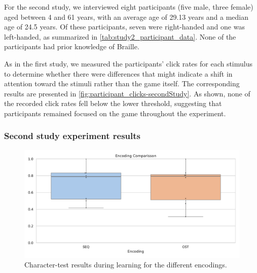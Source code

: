 

For the second study, we interviewed eight participants (five male, three female) aged between 4 and 61 years, with an average age of 29.13 years and a median age of 24.5 years. Of these participants, seven were right-handed and one was left-handed, as summarized in \autoref{tab:study2_participant_data}. None of the participants had prior knowledge of Braille.

As in the first study, we measured the participants' click rates for each stimulus to determine whether there were differences that might indicate a shift in attention toward the stimuli rather than the game itself. The corresponding results are presented in \autoref{fig:participant_clicks-secondStudy}. As shown, none of the recorded click rates fell below the lower threshold, suggesting that participants remained focused on the game throughout the experiment.


\subsubsection{Second study experiment results}

\begin{figure}
    \centering
    \includegraphics[width=0.5\linewidth]{src/pictures/Study2Data_Experiment/learning_averaged.pdf}
 \caption{Character-test results during learning for the different encodings.}
    \label{fig:learning_results_secondStudy}
\end{figure}

